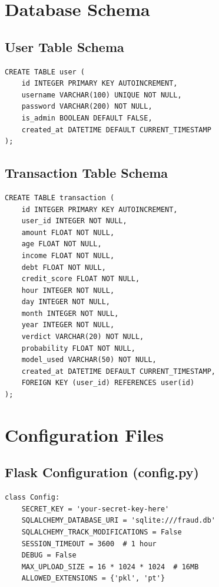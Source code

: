 \documentclass[12pt,a4paper,twoside]{report}
\begin{document}
\section{Database Schema}

\subsection{User Table Schema}

\begin{verbatim}
CREATE TABLE user (
    id INTEGER PRIMARY KEY AUTOINCREMENT,
    username VARCHAR(100) UNIQUE NOT NULL,
    password VARCHAR(200) NOT NULL,
    is_admin BOOLEAN DEFAULT FALSE,
    created_at DATETIME DEFAULT CURRENT_TIMESTAMP
);
\end{verbatim}

\subsection{Transaction Table Schema}

\begin{verbatim}
CREATE TABLE transaction (
    id INTEGER PRIMARY KEY AUTOINCREMENT,
    user_id INTEGER NOT NULL,
    amount FLOAT NOT NULL,
    age FLOAT NOT NULL,
    income FLOAT NOT NULL,
    debt FLOAT NOT NULL,
    credit_score FLOAT NOT NULL,
    hour INTEGER NOT NULL,
    day INTEGER NOT NULL,
    month INTEGER NOT NULL,
    year INTEGER NOT NULL,
    verdict VARCHAR(20) NOT NULL,
    probability FLOAT NOT NULL,
    model_used VARCHAR(50) NOT NULL,
    created_at DATETIME DEFAULT CURRENT_TIMESTAMP,
    FOREIGN KEY (user_id) REFERENCES user(id)
);
\end{verbatim}

\section{Configuration Files}

\subsection{Flask Configuration (config.py)}

\begin{verbatim}
class Config:
    SECRET_KEY = 'your-secret-key-here'
    SQLALCHEMY_DATABASE_URI = 'sqlite:///fraud.db'
    SQLALCHEMY_TRACK_MODIFICATIONS = False
    SESSION_TIMEOUT = 3600  # 1 hour
    DEBUG = False
    MAX_UPLOAD_SIZE = 16 * 1024 * 1024  # 16MB
    ALLOWED_EXTENSIONS = {'pkl', 'pt'}
\end{verbatim}
\end{document}
